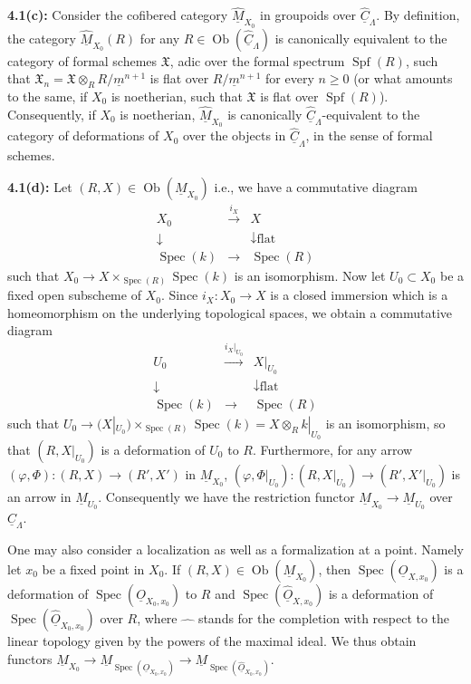 \documentclass[11pt]{article}
\theoremstyle{plain}
\theoremstyle{definition}
\theoremstyle{remark}
\DeclareMathOperator{\Spec}{Spec}
\DeclareMathOperator{\Spf}{Spf}
\DeclareMathOperator{\ob}{Ob}
\begin{document}
\medskip
\noindent\textbf{4.1(c):} Consider the cofibered category $\widehat{\underline{M}}_{X_0}$ in groupoids over $\widehat{\underline{C}}_\Lambda$. By definition, the category $\widehat{\underline{M}}_{X_0}(R)$ for any $R \in \ob(\widehat{\underline{C}}_\Lambda)$ is canonically equivalent to the category of formal schemes $\mathfrak{X}$, adic over the formal spectrum $\Spf(R)$, such that $\mathfrak{X}_n = \mathfrak{X} \otimes_R R/\underline{m}^{n+1}$ is flat over $R/\underline{m}^{n+1}$ for every $n \geq 0$ (or what amounts to the same, if $X_0$ is noetherian, such that $\mathfrak{X}$ is flat over $\Spf(R)$). Consequently, if $X_0$ is noetherian, $\widehat{\underline{M}}_{X_0}$ is canonically $\widehat{\underline{C}}_\Lambda$-equivalent to the category of deformations of $X_0$ over the objects in $\widehat{\underline{C}}_\Lambda$, in the sense of formal schemes.

\medskip
\noindent\textbf{4.1(d):} Let $(R, X) \in \ob(\underline{M}_{X_0})$ i.e., we have a commutative diagram
\[
\begin{array}{ccc}
X_0 & \xrightarrow{i_X} & X \\
\downarrow & & \downarrow\scriptstyle{\text{flat}} \\
\Spec(k) & \longrightarrow & \Spec(R)
\end{array}
\]
such that $X_0 \to X \times_{\Spec(R)} \Spec(k)$ is an isomorphism. Now let $U_0 \subset X_0$ be a fixed open subscheme of $X_0$. Since $i_X : X_0 \to X$ is a closed immersion which is a homeomorphism on the underlying topological spaces, we obtain a commutative diagram
\[
\begin{array}{ccc}
U_0 & \xrightarrow{i_X|_{U_0}} & X|_{U_0} \\
\downarrow & & \downarrow\scriptstyle{\text{flat}} \\
\Spec(k) & \longrightarrow & \Spec(R)
\end{array}
\]
such that $U_0 \to (X|_{U_0}) \times_{\Spec(R)} \Spec(k) = X \otimes_R k|_{U_0}$ is an isomorphism, so that $(R, X|_{U_0})$ is a deformation of $U_0$ to $R$. Furthermore, for any arrow $(\varphi,\Phi) : (R, X) \to (R', X')$ in $\underline{M}_{X_0}$, $(\varphi, \Phi|_{U_0}) : (R, X|_{U_0}) \to (R', X'|_{U_0})$ is an arrow in $\underline{M}_{U_0}$. Consequently we have the restriction functor $\underline{M}_{X_0} \to \underline{M}_{U_0}$ over $\underline{C}_\Lambda$.

One may also consider a localization as well as a formalization at a point. Namely let $x_0$ be a fixed point in $X_0$. If $(R, X) \in \ob(\underline{M}_{X_0})$, then $\Spec(\underline{O}_{X,x_0})$ is a deformation of $\Spec(\underline{O}_{X_0,x_0})$ to $R$ and $\Spec(\widehat{\underline{O}}_{X,x_0})$ is a deformation of $\Spec(\widehat{\underline{O}}_{X_0,x_0})$ over $R$, where $\widehat{\quad}$ stands for the completion with respect to the linear topology given by the powers of the maximal ideal. We thus obtain functors $\underline{M}_{X_0} \to \underline{M}_{\Spec(\underline{O}_{X_0,x_0})} \to \underline{M}_{\Spec(\widehat{\underline{O}}_{X_0,x_0})}$.
\end{document}
